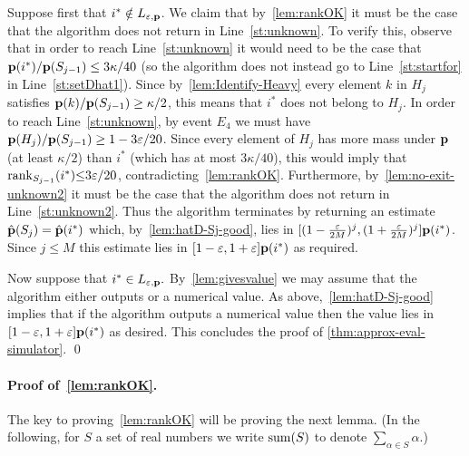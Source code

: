 Suppose first that $i^\ast \notin L_{\varepsilon,\mathbf{p}}$.
We claim that by~\cref{lem:rankOK}
it must be the case that the algorithm does not return \unknown
in Line~\ref{st:unknown}.
To verify this, observe that in order to reach Line~\ref{st:unknown}
it would need to be the case that
$\mathbf{p}(i^\ast)/\mathbf{p}(S_{j-1}) \leq 3 \kappa/40$ (so the algorithm does
not instead go to Line~\ref{st:startfor}
in Line~\ref{st:setDhat1}). Since
by~\cref{lem:Identify-Heavy} every element $k$ in $H_{j}$
satisfies $\mathbf{p}(k)/\mathbf{p}(S_{j-1}) \geq \kappa/2$, this means
that $i^\ast$ does not belong to $H_{j}.$
In order to reach Line~\ref{st:unknown}, by event $E_4$ we must have
$\mathbf{p}(H_{j})/\mathbf{p}(S_{j-1}) \geq 1 - 3 \varepsilon/20$.  Since
every element of $H_{j}$ has more mass under $\mathbf{p}$ (at least $\kappa/2$)
than $i^\ast$ (which has at most $3 \kappa/40$),
this would imply that $\operatorname{rank}_{S_{j-1}}(i^\ast) {\leq } 3 \varepsilon/20$,
contradicting~\cref{lem:rankOK}.
Furthermore, by~\cref{lem:no-exit-unknown2} it must
be the case that the algorithm does not return \unknown
in Line~\ref{st:unknown2}.
Thus the algorithm terminates by returning an estimate
$\hat{\mathbf{p}}(S_j) = \hat{\mathbf{p}}(i^\ast)$ which, by~\cref{lem:hatD-Sj-good}, lies
in $[(1 -  {\frac{\varepsilon}{2M}})^{j},
(1+ {\frac{\varepsilon}{2M}})^{j}] \mathbf{p}(i^\ast)$.  Since $j \leq M$ this estimate lies in $[1-\varepsilon,1+\varepsilon]\mathbf{p}(i^\ast)$
as required.

Now suppose that $i^\ast \in L_{\varepsilon,\mathbf{p}}.$  By~\cref{lem:givesvalue}
we may assume that the algorithm either outputs \unknown or a numerical value.
As above,~\cref{lem:hatD-Sj-good} implies that if the algorithm
outputs a numerical value then the value lies in $[1-\varepsilon,1+\varepsilon]\mathbf{p}(i^\ast)$
as desired. This concludes the proof of
\cref{thm:approx-eval-simulator}.
\qed

\paragraph{Proof of~\cref{lem:rankOK}.}
\label{sec:proof-of-rankOK}


The key to proving~\cref{lem:rankOK}
will be proving the next lemma.
(In the following, for $S$ a set of real numbers we write
$\operatorname{sum}(S)$ to denote $\sum_{\alpha \in S}\alpha.$)

